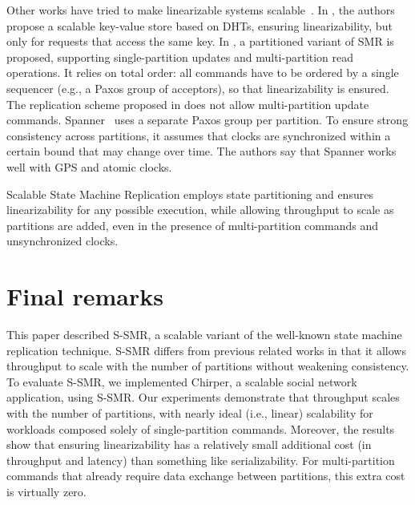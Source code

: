 \documentclass[11pt]{article}
\begin{document}
Other works have tried to make linearizable systems scalable~\cite{corbett2013spanner, Glendenning2011, Marandi11}.
In \cite{Glendenning2011}, the authors propose a scalable key-value store based on DHTs, ensuring linearizability, but only for requests that access the same key.
In \cite{Marandi11}, a partitioned variant of SMR is proposed, supporting single-partition updates and multi-partition read operations.
It relies on total order: all commands have to be ordered by a single sequencer (e.g., a Paxos group of acceptors), so that linearizability is ensured.
The replication scheme proposed in \cite{Marandi11} does not allow multi-partition update commands.
Spanner~\cite{corbett2013spanner} uses a separate Paxos group per partition.
To ensure strong consistency across partitions, it assumes that clocks are synchronized within a certain bound that may change over time.
The authors say that Spanner works well with GPS and atomic clocks.

Scalable State Machine Replication employs state partitioning and ensures linearizability for any possible execution, while allowing throughput to scale as partitions are added, even in the presence of multi-partition commands and unsynchronized clocks.

\section{Final remarks}

This paper described S-SMR, a scalable variant of the well-known state machine replication technique.
S-SMR differs from previous related works in that it allows throughput to scale with the number of partitions without weakening consistency.
To evaluate S-SMR, we implemented Chirper, a scalable social network application, using S-SMR.
Our experiments demonstrate that throughput scales with the number of partitions, with nearly ideal (i.e., linear) scalability for workloads composed solely of single-partition commands.
Moreover, the results show that ensuring linearizability has a relatively small additional cost (in throughput and latency) than something like serializability.
For multi-partition commands that already require data exchange between partitions, this extra cost is virtually zero.



\end{document}
